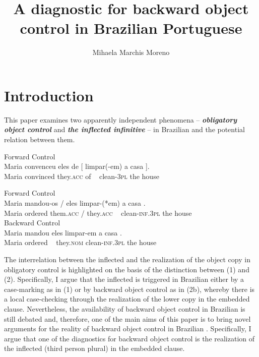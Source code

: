 \documentclass[output=paper]{langsci/langscibook}
\author{Mihaela Marchis Moreno\affiliation{FCSH, Universidade Nova de Lisboa}}
\title{A diagnostic for backward object control in Brazilian Portuguese}
\begin{document}
\section{Introduction}%
This paper examines two apparently independent phenomena – \textbf{\textit{obligatory object control}} and \textbf{\textit{the inflected infinitive} }– in Brazilian  and the potential relation between them.

\ea%
         Forward Control\label{ex:moreno:1}\\
    \gll Maria convenceu eles  de    [  limpar(-em)   a     casa ].\\
         Maria convinced they.\textsc{acc} of ~  clean-\textsc{3pl}  the house\\
\z

\ea\label{ex:moreno:2}%
    \ea  Forward Control\\
    \gll Maria  mandou-os                   /   eles        {\ob}  limpar-(*em) a     casa {\cb}.   \\
         Maria {ordered  them.\textsc{acc}} /   they.\textsc{acc}   ~   clean-\textsc{inf.3pl} the house\\
    \glt
    \ex  Backward Control\\
    \gll Maria mandou {\ob}    eles    limpar-em     a     casa {\cb}.\\
         Maria  ordered  ~  they.\textsc{nom}      clean-\textsc{inf.3pl}          the house\\
        \z
\z

The interrelation between the inflected  and the realization of the object copy in obligatory control is highlighted on the basis of the distinction between (1) and (2). Specifically, I argue that the inflected  is triggered in Brazilian  either by a case-marking  as in (1) or by backward object control as in (2b), whereby there is a local case-checking through the realization of the lower copy in the embedded clause. Nevertheless, the availability of backward object control in Brazilian  is still debated and, therefore, one of the main aims of this paper is to bring novel arguments for the reality of backward object control in Brazilian . Specifically, I argue that one of the diagnostics for backward object control is the realization of the inflected  (third person plural) in the embedded clause.
\end{document}
